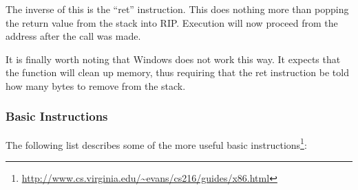 				The inverse of this is the ``ret'' instruction. 
				This does nothing more than popping the return value from the stack into RIP. 
				Execution will now proceed from the address after the call was made. 

				It is finally worth noting that Windows does not work this way. 
				It expects that the function will clean up memory, thus requiring that the ret instruction be told how many bytes to remove from the stack. 

			\subsubsection{Basic Instructions}
				The following list describes some of the more useful basic instructions\footnote{\url{http://www.cs.virginia.edu/~evans/cs216/guides/x86.html}}:
